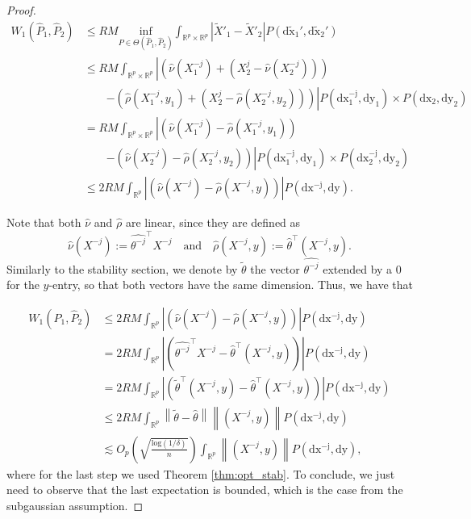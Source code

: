 \documentclass{article}
\theoremstyle{plain}
\theoremstyle{definition}
\theoremstyle{remark}
\begin{document}
\begin{proof}
 
  \begin{align*}
     W_1(\hat{P}_1, \hat{P}_2)  &\leq  RM\underset{P \in \Theta(\hat{P}_1, \hat{P}_2)}{\mathrm{inf}}
        \int_{\mathbb{R}^p \times \mathbb{R}^p} 
        |\widetilde{X}'_1-\widetilde{X}'_2| P(\mathrm{d\widetilde{x}_1',d\widetilde{x}_2'})\\
        &\leq RM \int_{\mathbb{R}^p \times \mathbb{R}^p} 
        \left|\left(\widehat{\nu}(X_1^{-j})+\left(X^j_2-\widehat{\nu}(X^{-j}_2)\right)\right)\right. \\ &\qquad\left.
        -\left(\widehat{\rho}(X_1^{-j}, y_1)+\left(X^j_2-\widehat{\rho}(X^{-j}_2, y_2)\right)\right)\right| P(\mathrm{dx_1^{-j},dy_1})\times P(\mathrm{dx_2,dy_2})\\
        & = RM \int_{\mathbb{R}^p \times \mathbb{R}^p} 
        \left|\left(\widehat{\nu}(X_1^{-j})-\widehat{\rho}(X_1^{-j}, y_1)\right)\right. \\ &\qquad\left.
        -\left(\widehat{\nu}(X^{-j}_2)-\widehat{\rho}(X^{-j}_2, y_2)\right)\right| P(\mathrm{dx_1^{-j},dy_1})\times P(\mathrm{dx_2^{-j},dy_2})
        \\&\leq 2RM \int_{\mathbb{R}^p} 
        \left|\left(\widehat{\nu}(X^{-j})-\widehat{\rho}(X^{-j}, y)\right)\right| P(\mathrm{dx^{-j},dy}).
 \end{align*}
 
 
Note that both $\widehat{\nu}$ and $\widehat{\rho}$ are linear, since they are defined as
\[
\widehat{\nu}(X^{-j}) := \widehat{\theta^{-j}}^\top X^{-j} \quad \text{and} \quad 
\widehat{\rho}(X^{-j}, y) := \widehat{\theta}^\top (X^{-j}, y).
\]
Similarly to the stability section, we denote by $\widetilde{\theta}$ the vector $\widehat{\theta^{-j}}$ extended by a $0$ for the $y$-entry, so that both vectors have the same dimension. Thus, we have that 
 
 \begin{align*}
     W_1(\hat{P}_1, \hat{P}_2) &\leq 2RM \int_{\mathbb{R}^p} 
        \left|\left(\widehat{\nu}(X^{-j})-\widehat{\rho}(X^{-j}, y)\right)\right| P(\mathrm{dx^{-j},dy})\\
        &= 2RM \int_{\mathbb{R}^p}
        \left|\left(\widehat{\theta^{-j}}^\top X^{-j}-\widehat{\theta}^\top(X^{-j}, y)\right)\right| P(\mathrm{dx^{-j},dy})\\
        &= 2RM \int_{\mathbb{R}^p}
        \left|\left(\widetilde{\theta}^\top (X^{-j}, y)-\widehat{\theta}^\top(X^{-j}, y)\right)\right| P(\mathrm{dx^{-j},dy})\\ 
        &\leq 2RM \int_{\mathbb{R}^p}
        \left\|\widetilde{\theta}-\widehat{\theta}\right\| \left\|(X^{-j}, y)\right\| P(\mathrm{dx^{-j},dy})\\
        & \lesssim O_p\left(\sqrt{\frac{\mathrm{log}(1/\delta)}{n}}\right)\int_{\mathbb{R}^p}\left\|(X^{-j}, y)\right\| P(\mathrm{dx^{-j},dy}),
 \end{align*}
 where for the last step we used Theorem \ref{thm:opt_stab}. To conclude, we just need to observe that the last expectation is bounded, which is the case from the subgaussian assumption.
 \end{proof}
 
\end{document}
